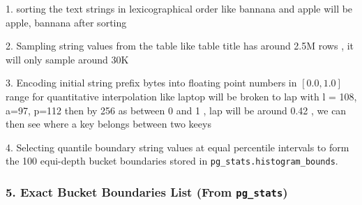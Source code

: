 \documentclass[11pt,a4paper]{article}
\begin{document}
1. sorting the text strings in lexicographical order like bannana and apple will be apple, bannana after sorting

2. Sampling string values from the table like table title has around 2.5M rows , it will only sample around 30K

3. Encoding initial string prefix bytes into floating point numbers in $[0.0, 1.0]$ range for quantitative interpolation like laptop will be broken to lap with l = 108, a=97, p=112 then by 256 as between 0 and 1 , lap will be around 0.42 , we can then see where a key belongs between two keeys

4. Selecting quantile boundary string values at equal percentile intervals to form the 100 equi-depth bucket boundaries stored in \texttt{pg\_stats.histogram\_bounds}.


\subsubsection{5. Exact Bucket Boundaries List (From \texttt{pg\_stats})}
\end{document}
